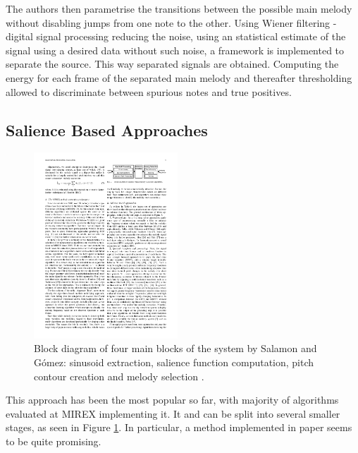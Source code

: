 The authors then parametrise the transitions between the possible main melody without disabling jumps from one note to the other. Using Wiener filtering - digital signal processing reducing the noise, using an statistical estimate of the signal using a desired data without such noise, a framework is implemented to separate the source. This way separated signals are obtained. Computing the energy for each frame of the separated main melody and thereafter thresholding allowed to discriminate between spurious notes and true positives.

\vspace{10pt}


\subsection{Salience Based Approaches}

\begin{figure}
  \vspace{-60pt}

  \begin{center}
    \includegraphics[width=0.48\textwidth]{Figures/salienceoveralldiagram}
  \end{center}
  \caption{Block diagram of four main blocks of the system by Salamon and G\'{o}mez: sinusoid extraction, salience function computation, pitch contour creation and melody selection \cite{comparison}.}
  \label{fig:3stepsalience}
\end{figure}

This approach has been the most popular so far, with majority of algorithms evaluated at MIREX implementing it. It and can be split into several smaller stages, as seen in Figure \ref{fig:3stepsalience}. In particular, a method implemented in paper \cite{salamon} seems to be quite promising.

